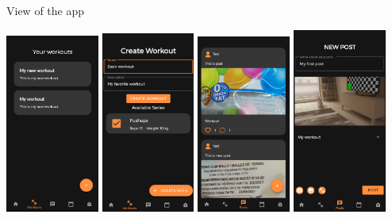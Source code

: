\documentclass[12pt]{beamer}
\begin{document}
\begin{frame}{View of the app}
{\begin{center}
\includegraphics[width=0.23\textwidth]{yourworkouts}
\includegraphics[width=0.23\textwidth]{createworkout}
\includegraphics[width=0.23\textwidth]{yourposts}
\includegraphics[width=0.23\textwidth]{crearpost}
\end{center}
}

\end{frame}
\end{document}
